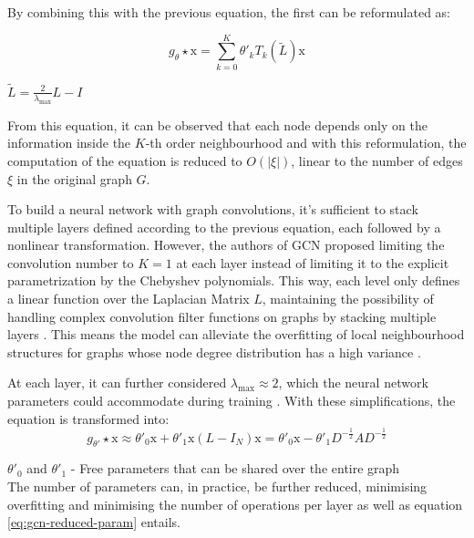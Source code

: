 By combining this with the previous equation, the first can be reformulated as:

\begin{equation}
	g_\theta \star \text{x} = \sum^K_{k=0} \theta'_k T_k(\tilde{L}) \text{x}
\end{equation}

$\tilde{L} = \frac{2}{\lambda_\text{max}} L - I$ 

From this equation, it can be observed that each node depends only on the information inside the $K$-th order neighbourhood and with this reformulation, the computation of the equation is reduced to $O(|\xi|)$, linear to the number of edges $\xi$ in the original graph $G$. \par

To build a neural network with graph convolutions, it's sufficient to stack multiple layers defined according to the previous equation, each followed by a nonlinear transformation. However, the authors of \ac{GCN} \cite{kipfSemiSupervisedClassificationGraph2017} proposed limiting the convolution number to $K = 1$ at each layer instead of limiting it to the explicit parametrization by the Chebyshev polynomials. This way, each level only defines a linear function over the Laplacian Matrix $L$, maintaining the possibility of handling complex convolution filter functions on graphs by stacking multiple layers \cite{kipfSemiSupervisedClassificationGraph2017, tangGraphNeuralNetworks2022}. This means the model can alleviate the overfitting of local neighbourhood structures for graphs whose node degree distribution has a high variance \cite{kipfSemiSupervisedClassificationGraph2017, tangGraphNeuralNetworks2022}.

At each layer, it can further considered $\lambda_\text{max} \approx 2$, which the neural network parameters could accommodate during training \cite{tangGraphNeuralNetworks2022}. With these simplifications, the equation is transformed into:
\begin{equation}
	g_{\theta'} \star \text{x} \approx \theta'_0 \text{x} + \theta'_1 \text{x} (L - I_N) \text{x} = \theta'_0 \text{x} - \theta'_1 D^{-\frac{1}{2}} AD^{-\frac{1}{2}}
\end{equation}

$\theta'_0$ and $\theta'_1$ - Free parameters that can be shared over the entire graph \\


The number of parameters can, in practice, be further reduced, minimising overfitting and minimising the number of operations per layer as well \cite{tangGraphNeuralNetworks2022} as equation \ref{eq:gcn-reduced-param} entails.


